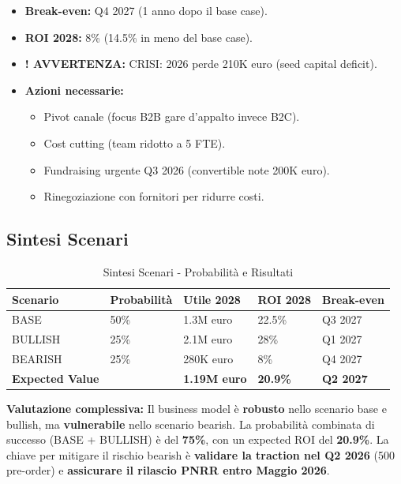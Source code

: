 \documentclass[11pt,a4paper]{report}
\newcommand{\warningtext}{\textbf{! AVVERTENZA: }}
\begin{document}
\begin{itemize}
\item {\bf Break-even:} Q4 2027 (1 anno dopo il base case).
\item {\bf ROI 2028:} 8\% (14.5\% in meno del base case).
\item {\warningtext CRISI:} 2026 perde 210K euro (seed capital deficit).
\item {\bf Azioni necessarie:}
\begin{itemize}
\item Pivot canale (focus B2B gare d'appalto invece B2C).
\item Cost cutting (team ridotto a 5 FTE).
\item Fundraising urgente Q3 2026 (convertible note 200K euro).
\item Rinegoziazione con fornitori per ridurre costi.
\end{itemize}
\end{itemize}

\subsection{Sintesi Scenari}
\begin{table}[H]
\centering
\caption{Sintesi Scenari - Probabilità e Risultati}
\label{tab:scenario-summary}
\begin{tabular}{L{2.5cm} C{1.5cm} C{1.8cm} C{1.5cm} C{1.5cm}}
\toprule
{\bf Scenario} & {\bf Probabilità} & {\bf Utile 2028} & {\bf ROI 2028} & {\bf Break-even} \\
\midrule
BASE & 50\% & 1.3M euro & 22.5\% & Q3 2027 \\
BULLISH & 25\% & 2.1M euro & 28\% & Q1 2027 \\
BEARISH & 25\% & 280K euro & 8\% & Q4 2027 \\
\midrule
{\bf Expected Value} & & {\bf 1.19M euro} & {\bf 20.9\%} & {\bf Q2 2027} \\
\bottomrule
\end{tabular}
\end{table}

{\bf Valutazione complessiva:} Il business model è {\bf robusto} nello scenario base e bullish, ma {\bf vulnerabile} nello scenario bearish. La probabilità combinata di successo (BASE + BULLISH) è del {\bf 75\%}, con un expected ROI del {\bf 20.9\%}. La chiave per mitigare il rischio bearish è {\bf validare la traction nel Q2 2026} (500 pre-order) e {\bf assicurare il rilascio PNRR entro Maggio 2026}.
\end{document}
